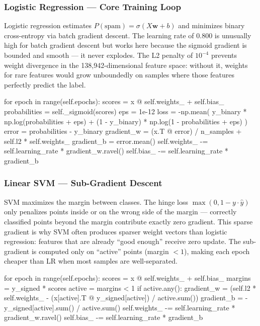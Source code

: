 \subsubsection{Logistic Regression — Core Training Loop}

Logistic regression estimates $P(\text{spam}) = \sigma(X\mathbf{w} + b)$ and minimizes binary cross-entropy via batch gradient descent. The learning rate of 0.800 is unusually high for batch gradient descent but works here because the sigmoid gradient is bounded and smooth — it never explodes. The L2 penalty of $10^{-4}$ prevents weight divergence in the 138,942-dimensional feature space: without it, weights for rare features would grow unboundedly on samples where those features perfectly predict the label.

\begin{pythoncode}[caption={Logistic Regression: Batch Gradient Descent with Binary Cross-Entropy}]
for epoch in range(self.epochs):
    scores = x @ self.weights_ + self.bias_
    probabilities = self._sigmoid(scores)
    eps = 1e-12
    loss = -np.mean(
        y_binary * np.log(probabilities + eps)
        + (1 - y_binary) * np.log(1 - probabilities + eps)
    )
    error = probabilities - y_binary
    gradient_w = (x.T @ error) / n_samples + self.l2 * self.weights_
    gradient_b = error.mean()
    self.weights_ -= self.learning_rate * gradient_w.ravel()
    self.bias_ -= self.learning_rate * gradient_b
\end{pythoncode}

\subsubsection{Linear SVM — Sub-Gradient Descent}

SVM maximizes the margin between classes. The hinge loss $\max(0, 1 - y \cdot \hat{y})$ only penalizes points inside or on the wrong side of the margin — correctly classified points beyond the margin contribute exactly zero gradient. This sparse gradient is why SVM often produces sparser weight vectors than logistic regression: features that are already ``good enough'' receive zero update. The sub-gradient is computed only on ``active'' points (margin $< 1$), making each epoch cheaper than LR when most samples are well-separated.

\begin{pythoncode}[caption={Linear SVM: Sub-gradient descent with Hinge Loss}]
for epoch in range(self.epochs):
    scores = x @ self.weights_ + self.bias_
    margins = y_signed * scores
    active = margins < 1
    if active.any():
        gradient_w = (self.l2 * self.weights_
            - (x[active].T @ y_signed[active]) / active.sum())
        gradient_b = -y_signed[active].sum() / active.sum()
    self.weights_ -= self.learning_rate * gradient_w.ravel()
    self.bias_ -= self.learning_rate * gradient_b
\end{pythoncode}

